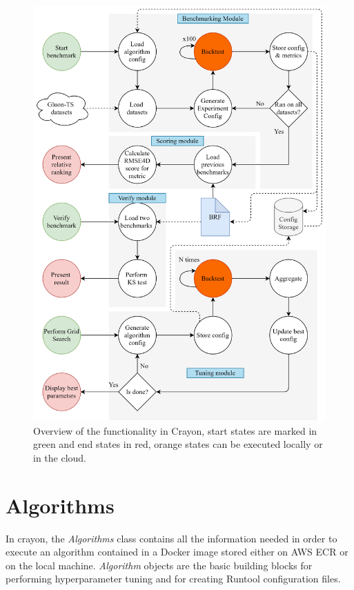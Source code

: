 \begin{figure}[htb]
  \centering
  \includegraphics[width=\linewidth]{./img/crayon_architecture.png}
  \caption{Overview of the functionality in Crayon, start states are marked in green and end states in red, orange states can be executed locally or in the cloud.}
  \label{fig:crayon_architecture}
  \endminipage\hfill
\end{figure}
\clearpage

\section{Algorithms}
\label{crayon:algorithms}
In crayon, the \textit{Algorithms} class contains all the information needed in order to execute an algorithm contained in a Docker image stored either on AWS ECR or on the local machine. \textit{Algorithm} objects are the basic building blocks for performing hyperparameter tuning and for creating Runtool configuration files.

